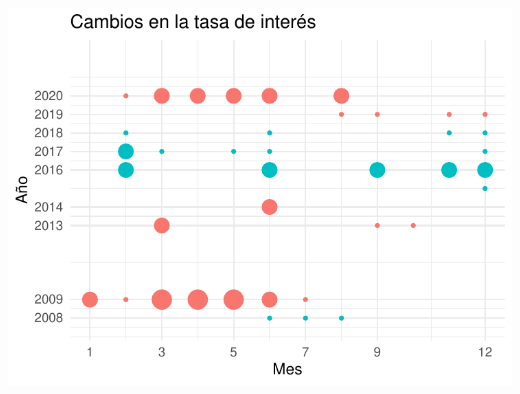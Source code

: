 \documentclass[
]{article}
\begin{document}
\begin{CodeChunk}


\begin{center}\includegraphics{reporte_tasa_files/figure-latex/graph2-1} \end{center}

\end{CodeChunk}
\end{document}
